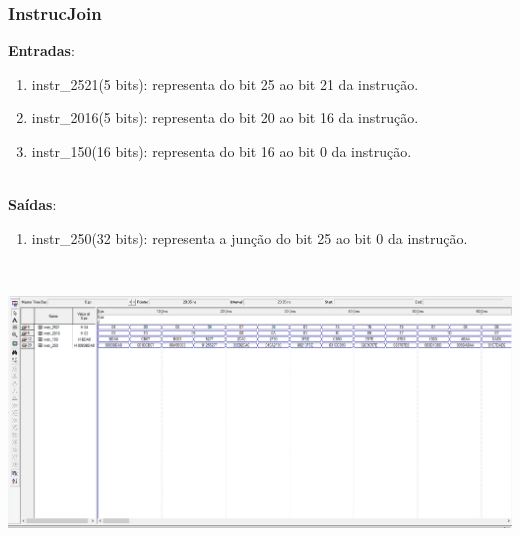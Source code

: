 \documentclass{article}
\begin{document}
    \subsubsection{InstrucJoin}
    \textbf{Entradas}:
    \begin{enumerate}
        \item instr\_2521(5 bits): representa do bit 25 ao bit 21 da instrução.
        \item instr\_2016(5 bits): representa do bit 20 ao bit 16 da instrução.
	    \item instr\_150(16 bits): representa do bit 16 ao bit 0 da instrução.\\
    \end{enumerate}
    \\
    \textbf{Saídas}:
    \begin{enumerate}
        \item instr\_250(32 bits): representa a junção do bit 25 ao bit 0 da instrução.\\
    \end{enumerate}\\
    \begin{center}
        \includegraphics[scale=0.4]{InstrucJoin.PNG}
    \end{center}
    \\
    \newpage
\end{document}
